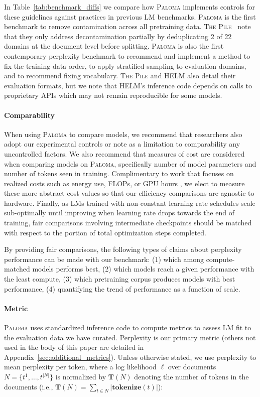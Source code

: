 In Table~\ref{tab:benchmark_diffs} we compare how \textsc{Paloma} implements controls for these guidelines against practices in previous LM benchmarks. \textsc{Paloma} is the first benchmark to remove contamination across all pretraining data. \textsc{The Pile}~\citep{Gao2020ThePA} note that they only address decontamination partially by deduplicating 2 of 22 domains at the document level before splitting. \textsc{Paloma} is also the first contemporary perplexity benchmark to recommend and implement a method to fix the training data order, to apply stratified sampling to evaluation domains, and to recommend fixing vocabulary. \textsc{The Pile} and HELM also detail their evaluation formats, but we note that HELM's inference code depends on calls to proprietary APIs which may not remain reproducible for some models.

\paragraph{Comparability} When using \textsc{Paloma} to compare models, we recommend that researchers also adopt our experimental controls or note as a limitation to comparability any uncontrolled factors. We also recommend that measures of cost are considered when comparing models on \textsc{Paloma}, specifically number of model parameters and number of tokens seen in training. Complimentary to work that focuses on realized costs such as energy use, FLOPs, or GPU hours \citep{Peng2023EfficiencyPA}, we elect to measure these more abstract cost values so that our efficiency comparisons are agnostic to hardware. Finally, as LMs trained with non-constant learning rate schedules scale sub-optimally until improving when learning rate drops towards the end of training, fair comparisons involving intermediate checkpoints should be matched with respect to the portion of total optimization steps completed.

By providing fair comparisons, the following types of claims about perplexity performance can be made with our benchmark: (1) which among compute-matched models performs best, (2) which models reach a given performance with the least compute, (3) which pretraining corpus produces models with best performance, (4) quantifying the trend of performance as a function of scale.

\label{sec:metrics}
\paragraph{Metric} \textsc{Paloma} uses standardized inference code to compute metrics to assess LM fit to the evaluation data we have curated. Perplexity \citep{Jelinek1977PerplexityaMO} is our primary metric (others not used in the body of this paper are detailed in Appendix~\ref{sec:additional_metrics}). Unless otherwise stated, we use perplexity to mean perplexity per token, where a log likelihood $\ell$ over documents $N = \{ t^{1},\ldots,t^{| N |} \}$ is normalized by $\mathbf{T}({N})$ denoting the number of tokens in the documents (i.e., $\mathbf{T}(N) = \sum_{t \in N} | \mathbf{tokenize}(t) |$):

